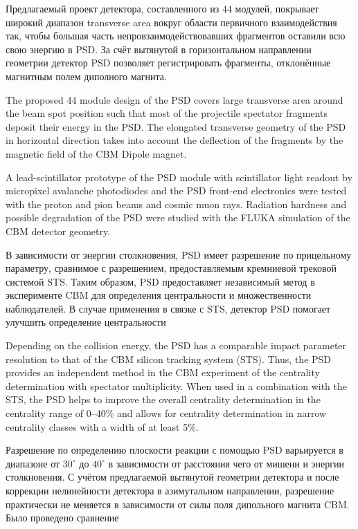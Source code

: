 
Предлагаемый проект детектора, составленного из 44 модулей, покрывает широкий диапазон transverse area \todo вокруг области первичного взаимодействия так, чтобы большая часть непровзаимодействовавших фрагментов оставили всю свою энергию в PSD. За счёт вытянутой в горизонтальном направлении геометрии детектор PSD позволяет регистрировать фрагменты, отклонённые магнитным полем диполного магнита.

The proposed 44 module design of the PSD covers large transverse area around the beam spot position such that most of the projectile spectator fragments deposit their energy in the PSD. The elongated transverse geometry of the PSD in horizontal direction takes into account the deflection of the fragments by the magnetic field of the CBM Dipole magnet.

A lead-scintillator prototype of the PSD module with scintillator light readout by micropixel avalanche
photodiodes and the PSD front-end electronics were tested with the proton and pion beams and cosmic
muon rays.   Radiation hardness and possible degradation of the PSD were studied with the FLUKA
simulation of the CBM detector geometry.

В зависимости от энергии столкновения, PSD имеет разрешение по прицельному параметру, сравнимое с разрешением, предоставляемым кремниевой трековой системой STS. Таким образом, PSD предоставляет независимый метод в эксперименте CBM для определения центральности и множественности наблюдателей. В случае применения в связке с STS, детектор PSD помогает улучшить определение центральности 

Depending on the collision energy, the PSD has a comparable impact parameter resolution to that of the CBM
silicon tracking system (STS). Thus, the PSD provides an independent method in the CBM experiment of the
centrality determination with spectator multiplicity. When used in a combination with the STS, the
PSD helps to improve the overall centrality determination in the centrality range of 0--40\% and allows
for centrality determination in narrow centrality classes with a width of at least 5\%.

Разрешение по определению плоскости реакции с помощью PSD варьируется в диапазоне от $30^\circ$ до $40^\circ$ в зависимости от расстояния \todo чего \todo от мишени и энергии столкновения. С учётом предлагаемой вытянутой геометрии детектора и после коррекции нелинейности детектора в азимутальном направлении, разрешение практически не меняется в зависимости от силы поля дипольного магнита CBM. Было проведено сравнение 

